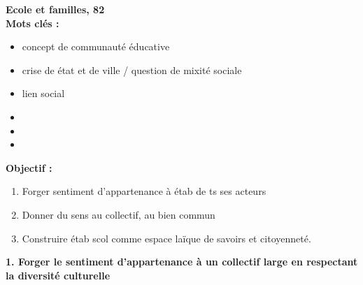\documentclass[12pt]{article}
\begin{document}
\textbf{Ecole et familles, 82} \\

\textbf{Mots clés : }
\begin{itemize}
\item concept de communauté éducative
\item crise de état et de ville / question de mixité sociale
\item lien social
\item 
\item 
\item 
\end{itemize}

\vspace{0.5cm}

\textbf{Objectif :}


\begin{enumerate}
\item Forger sentiment d'appartenance à étab de ts ses acteurs\\
\item Donner du sens au collectif, au bien commun\\
\item Construire étab scol comme espace laïque de savoirs et citoyenneté.\\
\end{enumerate}

\textbf{1. Forger le sentiment d'appartenance à un collectif large en respectant la diversité culturelle} \\
\end{document}
